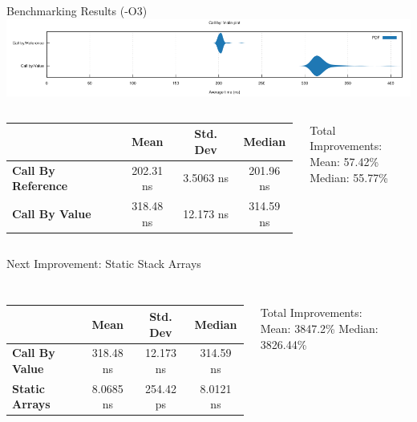\documentclass[compress,aspectratio=169]{beamer}
\begin{document}
\begin{frame}{Benchmarking Results (-O3)}
    \includegraphics[width=\textwidth]{../assets/first_violin.png}
  \begin{columns}
    \begin{column}{0.7\textwidth}
  \begin{table}[h]
\centering
\begin{tabular}{|l|c|c|c|}
\hline
& \textbf{Mean} & \textbf{Std. Dev} & \textbf{Median} \\
\hline
\textbf{Call By Reference} & 202.31 ns & 3.5063 ns & 201.96 ns \\
\hline
\textbf{Call By Value} & 318.48 ns & 12.173 ns & 314.59 ns \\
\hline
\end{tabular}
\end{table}
    \end{column}
    \begin{column}{0.3\textwidth}
      Total Improvements:\\
      Mean: 57.42\%\\
      Median: 55.77\%
    \end{column}
  \end{columns}
\end{frame}

\begin{frame}[fragile]{Next Improvement: Static Stack Arrays}
  \begin{tcolorbox}[title=Static Stack Arrays]
    \footnotesize\inputminted[xleftmargin=1em,linenos]{rust}{../assets/less_heap_allocation.rs}
  \end{tcolorbox}
  \begin{columns}
    \begin{column}{0.7\textwidth}
  \begin{table}[h]
    \centering
    \begin{tabular}{|l|c|c|c|}
      \hline
      &\textbf{Mean} & \textbf{Std. Dev} & \textbf{Median}\\
      \hline
      \textbf{Call By Value} & 318.48 ns & 12.173 ns & 314.59 ns \\
      \hline
      \textbf{Static Arrays} & 8.0685 ns & 254.42 ps & 8.0121 ns\\
      \hline
      \end{tabular}
  \end{table}
    \end{column}
    \begin{column}{0.3\textwidth}
      Total Improvements:\\
      Mean: 3847.2\%
      Median: 3826.44\%\\
    \end{column}
  \end{columns}
\end{frame}
\end{document}
